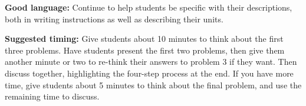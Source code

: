 \documentclass[nooutcomes,noauthor, handout]{ximera}
\begin{document}
\begin{instructorNotes}
{\bf Good language:} Continue to help students be specific with their descriptions, both in writing instructions as well as describing their units. 



{\bf Suggested timing:} Give students about 10 minutes to think about the first three problems. Have students present the first two problems, then give them another minute or two to re-think their answers to problem 3 if they want. Then discuss together, highlighting the four-step process at the end. If you have more time, give students about 5 minutes to think about the final problem, and use the remaining time to discuss.



\end{instructorNotes}
\end{document}
